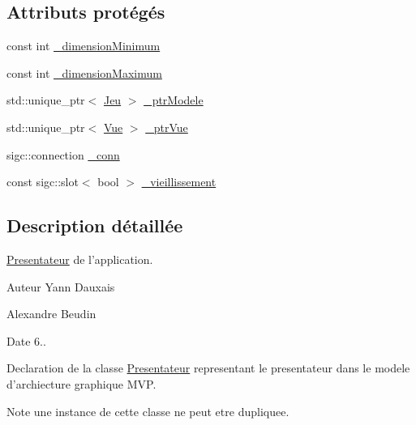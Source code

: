 \subsection*{Attributs protégés}
\begin{DoxyCompactItemize}
\item 
const int \hyperlink{classgrenouilloland_1_1Presentateur_a94ac9459edd7299793d43196d42575f2}{\-\_\-dimension\-Minimum}
\item 
const int \hyperlink{classgrenouilloland_1_1Presentateur_a8d205215e5a4880713eb016dd1266a20}{\-\_\-dimension\-Maximum}
\item 
std\-::unique\-\_\-ptr$<$ \hyperlink{classgrenouilloland_1_1Jeu}{Jeu} $>$ \hyperlink{classgrenouilloland_1_1Presentateur_a3418c1b3461d7e4a511ac71bf30d2a14}{\-\_\-ptr\-Modele}
\item 
std\-::unique\-\_\-ptr$<$ \hyperlink{classgrenouilloland_1_1Vue}{Vue} $>$ \hyperlink{classgrenouilloland_1_1Presentateur_a806d2e46bff9428800f7b063015b792c}{\-\_\-ptr\-Vue}
\item 
sigc\-::connection \hyperlink{classgrenouilloland_1_1Presentateur_adecdbfff3ad277099345f4e768f95e50}{\-\_\-conn}
\item 
const sigc\-::slot$<$ bool $>$ \hyperlink{classgrenouilloland_1_1Presentateur_ad51c240a49a31b60bf36578a14860ae8}{\-\_\-vieillissement}
\end{DoxyCompactItemize}


\subsection{Description détaillée}
\hyperlink{classgrenouilloland_1_1Presentateur}{Presentateur} de l'application. 

\begin{DoxyAuthor}{Auteur}
Yann Dauxais 

Alexandre Beudin 
\end{DoxyAuthor}
\begin{DoxyDate}{Date}
6..
\end{DoxyDate}
Declaration de la classe \hyperlink{classgrenouilloland_1_1Presentateur}{Presentateur} representant le presentateur dans le modele d'archiecture graphique M\-V\-P.

\begin{DoxyNote}{Note}
une instance de cette classe ne peut etre dupliquee. 
\end{DoxyNote}



